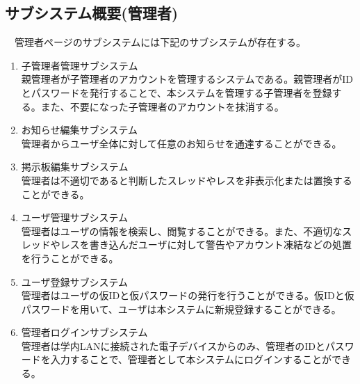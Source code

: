 \documentclass[a4j]{jarticle}
\begin{document}
\subsection{サブシステム概要(管理者)}
　管理者ページのサブシステムには下記のサブシステムが存在する。
\begin{enumerate}
  \item 子管理者管理サブシステム\\
  親管理者が子管理者のアカウントを管理するシステムである。親管理者がIDとパスワードを発行することで、本システムを管理する子管理者を登録する。また、不要になった子管理者のアカウントを抹消する。


  \item お知らせ編集サブシステム\\
  管理者からユーザ全体に対して任意のお知らせを通達することができる。


  \item 掲示板編集サブシステム\\
  管理者は不適切であると判断したスレッドやレスを非表示化または置換することができる。


  \item ユーザ管理サブシステム\\
  管理者はユーザの情報を検索し、閲覧することができる。また、不適切なスレッドやレスを書き込んだユーザに対して警告やアカウント凍結などの処置を行うことができる。


  \item ユーザ登録サブシステム\\
  管理者はユーザの仮IDと仮パスワードの発行を行うことができる。仮IDと仮パスワードを用いて、ユーザは本システムに新規登録することができる。


  \item 管理者ログインサブシステム\\
  管理者は学内LANに接続された電子デバイスからのみ、管理者のIDとパスワードを入力することで、管理者として本システムにログインすることができる。
\end{enumerate}
\end{document}

